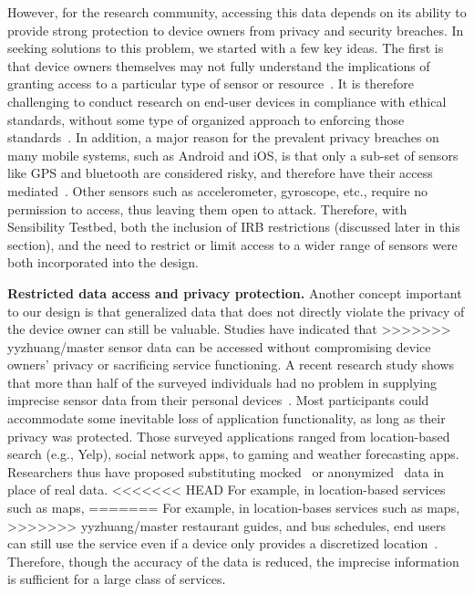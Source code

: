 {However, for the research community, accessing this data depends on its 
ability to provide strong protection to device owners from privacy and 
security breaches. In seeking solutions to this problem, we started with a 
few key ideas. The first is that device owners themselves may not fully 
understand the implications of granting access to a particular type of 
sensor or resource~\cite{felt2012android}. It is therefore challenging to 
conduct research on end-user devices in compliance with ethical standards, 
without some type of organized approach to enforcing those 
standards~\cite{zevenbergen2013ethical}. In addition, a major reason for 
the prevalent privacy breaches on many mobile systems, such as Android and iOS, 
is that only a sub-set of sensors like GPS and bluetooth are considered risky, 	
and therefore have their access mediated~\cite{android-sec}. Other sensors 
such as accelerometer, gyroscope, etc., require no permission to access, 
thus leaving them open to attack. Therefore, with Sensibility Testbed, 
both the inclusion of IRB restrictions (discussed later in this section), and 
the need to restrict or limit access to a wider range of sensors were both 
incorporated into the design.	

\textbf{Restricted data access and privacy protection.}
Another concept important to our design is that generalized data that 
does not directly violate the privacy of the device owner can still be 
valuable. Studies have indicated that 
>>>>>>> yyzhuang/master
sensor data can be accessed without compromising device 
owners' privacy or sacrificing service functioning.
A recent research study shows that more than half of the 
surveyed individuals had no problem in supplying imprecise 
sensor data from their personal devices~\cite{fawaz2014location}. 
Most participants could accommodate some inevitable loss of application 
functionality, as long as their privacy was protected. Those surveyed
applications ranged from location-based search (e.g., Yelp), social 
network apps, to gaming and weather forecasting apps. 
Researchers thus have proposed 
substituting mocked~\cite{beresford2011mockdroid} or 
anonymized~\cite{zhou2011taming} data in place of real data. 
<<<<<<< HEAD
For example, in location-based services such as maps, 
=======
For example, in location-bases services such as maps, 
>>>>>>> yyzhuang/master
restaurant guides, and bus schedules, end users can still use the 
service even if a device only provides a discretized 
location~\cite{amini2011cache, krumm2007inference}. Therefore, 
though the accuracy of the data is reduced, 
the imprecise information is sufficient for a large class of services. 

}
